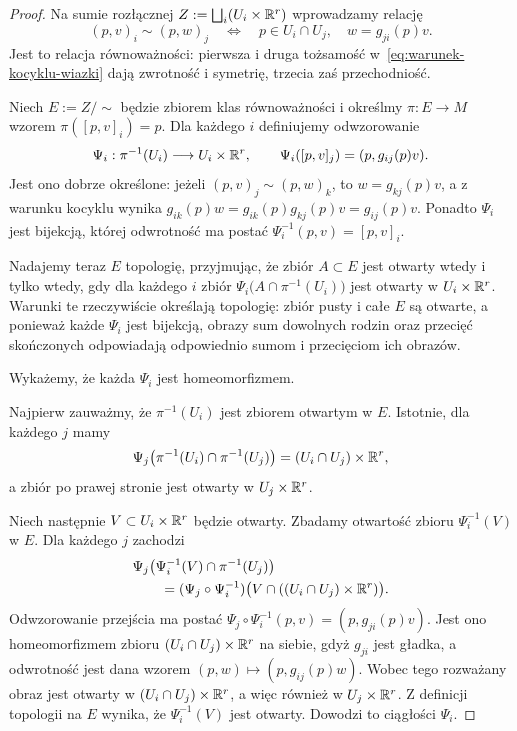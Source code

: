 \begin{proof}
Na sumie rozłącznej $Z:=\bigsqcup_i(U_i\times\mathbb{R}^r)$ wprowadzamy relację
\[
(p,v)_i\sim(p,w)_j
\quad\Longleftrightarrow\quad
p\in U_i\cap U_j,\quad w=g_{ji}(p)v.
\]
Jest to relacja równoważności: pierwsza i druga tożsamość
w~\eqref{eq:warunek-kocyklu-wiazki}
dają zwrotność i symetrię, trzecia zaś przechodniość.

Niech $E:=Z/\sim$ będzie zbiorem klas równoważności i określmy
$\pi:E\to M$ wzorem $\pi([p,v]_i)=p$.
Dla każdego $i$ definiujemy odwzorowanie
\[
\Psi_i:\pi^{-1}(U_i)\longrightarrow U_i\times\mathbb{R}^r,
\qquad
\Psi_i([p,v]_j)=(p,g_{ij}(p)v).
\]
Jest ono dobrze określone: jeżeli $(p,v)_j\sim(p,w)_k$, to
$w=g_{kj}(p)v$, a z warunku kocyklu wynika $g_{ik}(p)w =g_{ik}(p)g_{kj}(p)v =g_{ij}(p)v$.
Ponadto $\Psi_i$ jest bijekcją, której odwrotność ma postać $\Psi_i^{-1}(p,v)=[p,v]_i$.

Nadajemy teraz $E$ topologię, przyjmując, że zbiór $A\subset E$
jest otwarty wtedy i tylko wtedy, gdy dla każdego $i$ zbiór $\Psi_i\bigl(A\cap\pi^{-1}(U_i)\bigr)$
jest otwarty w $U_i\times\mathbb{R}^r$.
Warunki te rzeczywiście określają topologię: zbiór pusty i całe $E$
są otwarte, a ponieważ każde $\Psi_i$ jest bijekcją,
obrazy sum dowolnych rodzin oraz przecięć skończonych
odpowiadają odpowiednio sumom i przecięciom ich obrazów.

Wykażemy, że każda $\Psi_i$ jest homeomorfizmem.

Najpierw zauważmy, że $\pi^{-1}(U_i)$ jest zbiorem otwartym
w $E$. Istotnie, dla każdego $j$ mamy
\[
\Psi_j\bigl(
\pi^{-1}(U_i)\cap\pi^{-1}(U_j)
\bigr)
=(U_i\cap U_j)\times\mathbb{R}^r,
\]
a zbiór po prawej stronie jest otwarty w $U_j\times\mathbb{R}^r$.

Niech następnie $V\subset U_i\times\mathbb{R}^r$ będzie otwarty.
Zbadamy otwartość zbioru $\Psi_i^{-1}(V)$ w $E$.
Dla każdego $j$ zachodzi
\[
\begin{aligned}
&\Psi_j\bigl(
\Psi_i^{-1}(V)\cap\pi^{-1}(U_j)
\bigr)\\
&\qquad =
(\Psi_j\circ\Psi_i^{-1})
\bigl(V\cap((U_i\cap U_j)\times\mathbb{R}^r)\bigr).
\end{aligned}
\]
Odwzorowanie przejścia ma postać $\Psi_j\circ\Psi_i^{-1}(p,v) =(p,g_{ji}(p)v)$.
Jest ono homeomorfizmem zbioru
$(U_i\cap U_j)\times\mathbb{R}^r$ na siebie, gdyż $g_{ji}$
jest gładka, a odwrotność jest dana wzorem $(p,w)\longmapsto(p,g_{ij}(p)w)$.
Wobec tego rozważany obraz jest otwarty w
$(U_i\cap U_j)\times\mathbb{R}^r$, a więc również
w $U_j\times\mathbb{R}^r$. Z definicji topologii na $E$
wynika, że $\Psi_i^{-1}(V)$ jest otwarty.
Dowodzi to ciągłości $\Psi_i$.


\end{proof}
